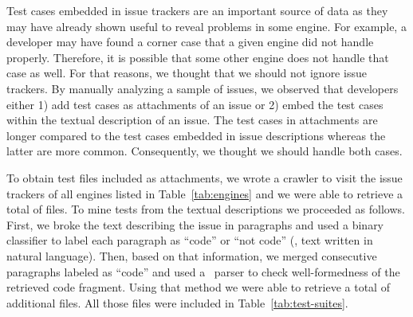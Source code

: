 \documentclass[smallextended]{svjour3}
\begin{document}

Test cases embedded in issue trackers are an important source of data
as they may have already shown useful to reveal problems in some
engine. For example, a developer may have found a corner case that a
given engine did not handle properly. Therefore, it is possible that
some other engine does not handle that case as well. For that reasons,
we thought that we should not ignore issue trackers. By manually
analyzing a sample of issues, we observed that developers either 1)
add test cases as attachments of an issue or 2) embed the test cases
within the textual description of an issue. The test cases in
attachments are longer compared to the test cases embedded in issue
descriptions whereas the latter are more common. Consequently, we
thought we should handle both cases.

To obtain test files included as attachments, we wrote a crawler to
visit the issue trackers of all engines listed in
Table~\ref{tab:engines} and we were able to retrieve a total of
\filesAttached{} files.  To mine tests from the textual descriptions we
proceeded as follows. First, we broke the text describing the issue in
paragraphs and used a binary classifier to label each paragraph as
``code'' or ``not code'' (\ie{}, text written in natural language). Then, based on
that information, we merged consecutive paragraphs labeled as ``code''
and used a \js\ parser to check well-formedness of the retrieved code
fragment. Using that method we were able to retrieve a total of
\filesMining{} additional files. All those files were included in
Table~\ref{tab:test-suites}.
\end{document}
